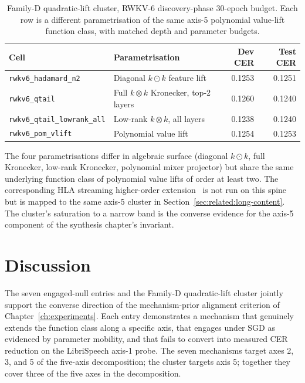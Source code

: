 \begin{table}[h]
\centering
\small
\caption[Family-D quadratic-lift cluster on RWKV-6
discovery]{Family-D quadratic-lift cluster, RWKV-6 discovery-phase
30-epoch budget. Each row is a different parametrisation of the
same axis-5 polynomial value-lift function class, with
matched depth and parameter budgets.}
\label{tab:results:family-d}
\setlength{\tabcolsep}{6pt}
\renewcommand{\arraystretch}{1.10}
\begin{tabularx}{\linewidth}{@{}X p{4.5cm} r r@{}}
\toprule
\textbf{Cell} & \textbf{Parametrisation} & \textbf{Dev CER} & \textbf{Test CER} \\
\midrule
\texttt{rwkv6\_hadamard\_n2}     & Diagonal $k \odot k$ feature lift  & 0.1253 & 0.1251 \\
\texttt{rwkv6\_qtail}            & Full $k \otimes k$ Kronecker, top-2 layers & 0.1260 & 0.1240 \\
\texttt{rwkv6\_qtail\_lowrank\_all} & Low-rank $k \otimes k$, all layers     & 0.1238 & 0.1240 \\
\texttt{rwkv6\_pom\_vlift}       & Polynomial value lift~\cite{picard2026pom} & 0.1254 & 0.1253 \\
\bottomrule
\end{tabularx}
\end{table}

The four parametrisations differ in algebraic surface (diagonal
$k \odot k$, full Kronecker, low-rank Kronecker, polynomial mixer
projector) but share the same underlying function class of
polynomial value lifts of order at least two. The corresponding
HLA streaming higher-order extension~\cite{zhang2025hla} is not run
on this spine but is mapped to the same axis-5 cluster in
Section~\ref{sec:related:long-content}. The cluster's saturation to a
narrow band is the converse evidence for the axis-5 component of the
synthesis chapter's invariant.

\section{Discussion}\label{app:engaged-null:discussion}

The seven engaged-null entries and the Family-D quadratic-lift
cluster jointly support the converse direction of the
mechanism-prior alignment criterion of
Chapter~\ref{ch:experiments}. Each entry demonstrates a mechanism
that genuinely extends the function class along a specific axis,
that engages under SGD as evidenced by parameter mobility, and that
fails to convert into measured CER reduction on the LibriSpeech axis-1
probe. The seven mechanisms target axes 2, 3, and 5 of the
five-axis decomposition; the cluster targets axis 5; together they
cover three of the five axes in the decomposition.

